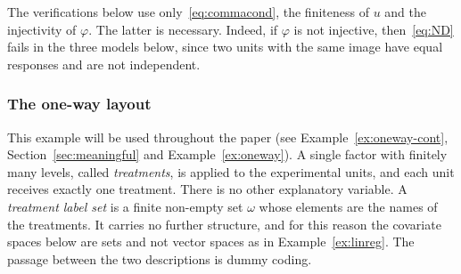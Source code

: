 \documentclass[11pt,a4paper]{article}
\theoremstyle{plain}
\theoremstyle{definition}
\theoremstyle{remark}
\begin{document}
The verifications below use only~\eqref{eq:commacond}, the finiteness of $u$
and the injectivity of $\varphi$. The latter is necessary. Indeed, if $\varphi$
is not injective, then~\eqref{eq:ND} fails in the three models below, since two
units with the same image have equal responses and are not independent.

\subsubsection{The one-way layout}

This example will be used throughout the paper (see
Example~\ref{ex:oneway-cont}, Section~\ref{sec:meaningful} and
Example~\ref{ex:oneway}). A single factor with finitely many levels, called
\emph{treatments}, is applied to the experimental units, and each unit receives
exactly one treatment. There is no other explanatory variable. A
\emph{treatment label set} is a finite non-empty set $\omega$ whose elements
are the names of the treatments. It carries no further structure, and for this
reason the covariate spaces below are sets and not vector spaces as in
Example~\ref{ex:linreg}. The passage between the two descriptions is dummy
coding.
\end{document}
